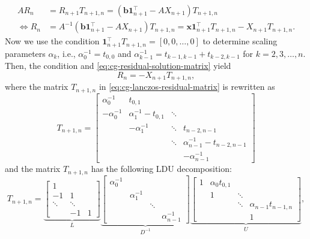 \begin{equation}\label{eq:cg-residual-solution-matrix}
\begin{aligned}
AR_n&=R_{n+1}T_{n+1,n}=(\bm b\bm1_{n+1}^{\top}-AX_{n+1})T_{n+1,n}\\
\Leftrightarrow R_n&=A^{-1}(\bm b\bm1_{n+1}^{\top}-AX_{n+1})T_{n+1,n}=\bm x\bm1_{n+1}^{\top}T_{n+1,n}-X_{n+1}T_{n+1,n}.
\end{aligned}\end{equation}
{Now we use the condition $\bm1_{n+1}^{\top}T_{n+1,n}=[0,0,\ldots,0]$ to determine scaling parameters $\alpha_k$, i.e., $\alpha_0^{-1}=t_{0,0}$ and $\alpha_{k-1}^{-1}=t_{k-1,k-1}+t_{k-2,k-1}$ for $k=2,3,\ldots,n$. Then, the condition and \eqref{eq:cg-residual-solution-matrix} yield}
\begin{equation}\label{eq:cg-residual-negative-product}R_n=-X_{n+1}T_{n+1,n},\end{equation}
{where the matrix $T_{n+1,n}$ in \eqref{eq:cg-lanczos-residual-matrix} is rewritten as}
\[T_{n+1,n}=\begin{bmatrix}
\alpha_0^{-1}&t_{0,1}&&\\-\alpha_0^{-1}&\alpha_1^{-1}-t_{0,1}&\ddots&\\
&-\alpha_1^{-1}&\ddots&t_{n-2,n-1}\\&&\ddots&\alpha_{n-1}^{-1}-t_{n-2,n-1}\\&&&-\alpha_{n-1}^{-1}
\end{bmatrix}\]
{and the matrix $T_{n+1,n}$ has the following LDU decomposition:}
\begin{equation}\label{eq:cg-lanczos-ldu}
T_{n+1,n}=\underbrace{\begin{bmatrix}1&&\\-1&1&\\\ddots&\ddots&\\&-1&1\end{bmatrix}}_L
\underbrace{\begin{bmatrix}\alpha_0^{-1}&&&\\&\alpha_1^{-1}&&\\&&\ddots&\\&&&\alpha_{n-1}^{-1}\end{bmatrix}}_{D^{-1}}
\underbrace{\begin{bmatrix}1&\alpha_0t_{0,1}&&\\&1&\ddots&\\&&\ddots&\alpha_{n-1}t_{n-1,n}\\&&&1\end{bmatrix}}_U,
\end{equation}
